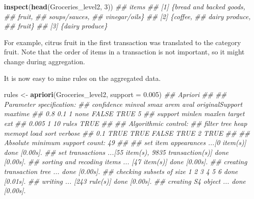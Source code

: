 \documentclass[
  notitlepage]{book}
\newenvironment{Shaded}{\begin{snugshade}}{\end{snugshade}}
\newcommand{\CommentTok}[1]{\textcolor[rgb]{0.56,0.35,0.01}{\textit{#1}}}
\newcommand{\DataTypeTok}[1]{\textcolor[rgb]{0.13,0.29,0.53}{#1}}
\newcommand{\DecValTok}[1]{\textcolor[rgb]{0.00,0.00,0.81}{#1}}
\newcommand{\FloatTok}[1]{\textcolor[rgb]{0.00,0.00,0.81}{#1}}
\newcommand{\KeywordTok}[1]{\textcolor[rgb]{0.13,0.29,0.53}{\textbf{#1}}}
\newcommand{\NormalTok}[1]{#1}
\newcommand{\StringTok}[1]{\textcolor[rgb]{0.31,0.60,0.02}{#1}}
\begin{document}
\begin{Shaded}
\begin{Highlighting}[]
\KeywordTok{inspect}\NormalTok{(}\KeywordTok{head}\NormalTok{(Groceries\_level2, }\DecValTok{3}\NormalTok{))}
\CommentTok{\#\#     items                    }
\CommentTok{\#\# [1] \{bread and backed goods, }
\CommentTok{\#\#      fruit,                  }
\CommentTok{\#\#      soups/sauces,           }
\CommentTok{\#\#      vinegar/oils\}           }
\CommentTok{\#\# [2] \{coffee,                 }
\CommentTok{\#\#      dairy produce,          }
\CommentTok{\#\#      fruit\}                  }
\CommentTok{\#\# [3] \{dairy produce\}}
\end{Highlighting}
\end{Shaded}

For example, citrus fruit in the first transaction was translated to the category fruit.
Note that the order of items in a transaction is not important, so it might change
during aggregation.

It is now easy to mine rules on the aggregated data.

\begin{Shaded}
\begin{Highlighting}[]
\NormalTok{rules \textless{}{-}}\StringTok{ }\KeywordTok{apriori}\NormalTok{(Groceries\_level2, }\DataTypeTok{support =} \FloatTok{0.005}\NormalTok{)}
\CommentTok{\#\# Apriori}
\CommentTok{\#\# }
\CommentTok{\#\# Parameter specification:}
\CommentTok{\#\#  confidence minval smax arem  aval originalSupport maxtime}
\CommentTok{\#\#         0.8    0.1    1 none FALSE            TRUE       5}
\CommentTok{\#\#  support minlen maxlen target  ext}
\CommentTok{\#\#    0.005      1     10  rules TRUE}
\CommentTok{\#\# }
\CommentTok{\#\# Algorithmic control:}
\CommentTok{\#\#  filter tree heap memopt load sort verbose}
\CommentTok{\#\#     0.1 TRUE TRUE  FALSE TRUE    2    TRUE}
\CommentTok{\#\# }
\CommentTok{\#\# Absolute minimum support count: 49 }
\CommentTok{\#\# }
\CommentTok{\#\# set item appearances ...[0 item(s)] done [0.00s].}
\CommentTok{\#\# set transactions ...[55 item(s), 9835 transaction(s)] done [0.00s].}
\CommentTok{\#\# sorting and recoding items ... [47 item(s)] done [0.00s].}
\CommentTok{\#\# creating transaction tree ... done [0.00s].}
\CommentTok{\#\# checking subsets of size 1 2 3 4 5 6 done [0.01s].}
\CommentTok{\#\# writing ... [243 rule(s)] done [0.00s].}
\CommentTok{\#\# creating S4 object  ... done [0.00s].}
\end{Highlighting}
\end{Shaded}
\end{document}
